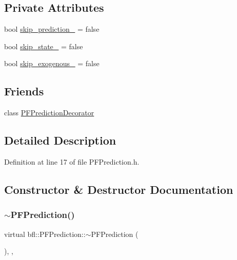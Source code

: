 \subsection*{Private Attributes}
\begin{DoxyCompactItemize}
\item 
bool \mbox{\hyperlink{classbfl_1_1PFPrediction_aec4b8a747bed1b38150bc2b1c21fb66d}{skip\+\_\+prediction\+\_\+}} = false
\item 
bool \mbox{\hyperlink{classbfl_1_1PFPrediction_ac094202f89c8190257715b665f2c07ca}{skip\+\_\+state\+\_\+}} = false
\item 
bool \mbox{\hyperlink{classbfl_1_1PFPrediction_a10c2de12cbd94e2051fc82a42d57aaaf}{skip\+\_\+exogenous\+\_\+}} = false
\end{DoxyCompactItemize}
\subsection*{Friends}
\begin{DoxyCompactItemize}
\item 
class \mbox{\hyperlink{classbfl_1_1PFPrediction_af2aa9540d676f442bcce073daa9974dd}{P\+F\+Prediction\+Decorator}}
\end{DoxyCompactItemize}


\subsection{Detailed Description}


Definition at line 17 of file P\+F\+Prediction.\+h.



\subsection{Constructor \& Destructor Documentation}
\mbox{\label{classbfl_1_1PFPrediction_a2183ecd8522d4a3f780c93256d10ecf8}} 
\subsubsection{\texorpdfstring{$\sim$\+P\+F\+Prediction()}{~PFPrediction()}}
{\footnotesize\ttfamily virtual bfl\+::\+P\+F\+Prediction\+::$\sim$\+P\+F\+Prediction (\begin{DoxyParamCaption}{ }\end{DoxyParamCaption})\hspace{0.3cm}{\ttfamily [inline]}, {\ttfamily [virtual]}, {\ttfamily [noexcept]}}



